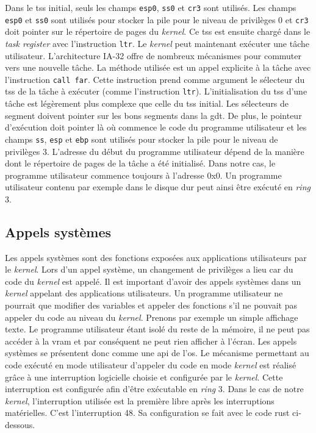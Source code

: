 Dans le \acrshort{tss} initial, seuls les champs \texttt{esp0},
\texttt{ss0} et \texttt{cr3} sont utilisés. Les champs
\texttt{esp0} et \texttt{ss0} sont utilisés pour stocker
la pile pour le niveau de privilèges 0 et \texttt{cr3} doit pointer
sur le répertoire de pages du \textit{kernel}. Ce \acrshort{tss} est ensuite chargé
dans le \textit{task register} avec l'instruction \texttt{ltr}. Le
\textit{kernel} peut maintenant exécuter une tâche utilisateur. L'architecture
\acrshort{IA-32} offre de nombreux mécanismes pour commuter vers une nouvelle
tâche. La méthode utilisée est un appel explicite à la tâche avec l'instruction
\texttt{call far}. Cette instruction prend comme argument le sélecteur
du \acrshort{tss} de la tâche à exécuter (comme l'instruction \texttt{ltr}).
L'initialisation du \acrshort{tss} d'une tâche est légèrement plus complexe que
celle du \acrshort{tss} initial. Les sélecteurs de segment doivent pointer sur les
bons segments dans la \acrshort{gdt}. De plus, le pointeur d'exécution doit
pointer là où commence le code du programme utilisateur et les champs \texttt{ss},
\texttt{esp} et \texttt{ebp} sont utilisés pour stocker la pile
pour le niveau de privilèges 3. L'adresse du début du programme utilisateur dépend
de la manière dont le répertoire de pages de la tâche a été initialisé. Dans notre
cas, le programme utilisateur commence toujours à l'adresse 0x0. Un programme
utilisateur contenu par exemple dans le disque dur peut ainsi être exécuté en
\textit{ring} 3.


\subsection{Appels systèmes}
Les appels systèmes sont des fonctions exposées aux applications utilisateurs par
le \textit{kernel}. Lors d'un appel système, un changement de privilèges a lieu
car du code du \textit{kernel} est appelé. Il est important d'avoir des appels
systèmes dans un \textit{kernel} appelant des applications utilisateurs.
Un programme utilisateur ne pourrait que modifier des variables et appeler des
fonctions s'il ne pouvait pas appeler du code au niveau du \textit{kernel}. Prenons
par exemple un simple affichage texte. Le programme utilisateur étant isolé du reste
de la mémoire, il ne peut pas accéder à la \acrshort{vram} et par conséquent ne
peut rien afficher à l'écran. Les appels systèmes se présentent donc comme une
\acrshort{api} de l'\acrshort{os}. Le mécanisme permettant au code exécuté en
mode utilisateur d'appeler du code en mode \textit{kernel}
est réalisé grâce à une interruption logicielle choisie et configurée par le \textit{kernel}.
Cette interruption est configurée afin d'être exécutable en \textit{ring} 3.
Dans le cas de notre \textit{kernel}, l'interruption utilisée est la première libre
après les interruptions matérielles. C'est l'interruption 48. Sa configuration se
fait avec le code rust ci-dessous.

